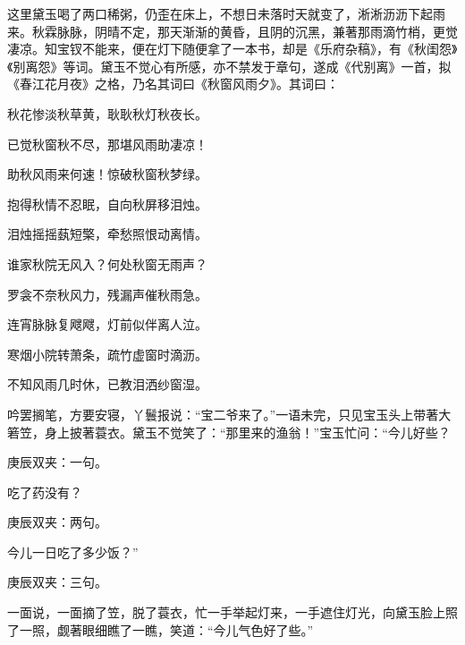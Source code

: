 \begin{parag}
    这里黛玉喝了两口稀粥，仍歪在床上，不想日未落时天就变了，淅淅沥沥下起雨来。秋霖脉脉，阴晴不定，那天渐渐的黄昏，且阴的沉黑，兼著那雨滴竹梢，更觉凄凉。知宝钗不能来，便在灯下随便拿了一本书，却是《乐府杂稿》，有《秋闺怨》《别离怨》等词。黛玉不觉心有所感，亦不禁发于章句，遂成《代别离》一首，拟《春江花月夜》之格，乃名其词曰《秋窗风雨夕》。其词曰：
\end{parag}


\begin{poem}
    \begin{pl}秋花惨淡秋草黄，耿耿秋灯秋夜长。\end{pl}

    \begin{pl}已觉秋窗秋不尽，那堪风雨助凄凉！\end{pl}

    \begin{pl}助秋风雨来何速！惊破秋窗秋梦绿。\end{pl}

    \begin{pl}抱得秋情不忍眠，自向秋屏移泪烛。\end{pl}

    \begin{pl}泪烛摇摇蓺短檠，牵愁照恨动离情。\end{pl}

    \begin{pl}谁家秋院无风入？何处秋窗无雨声？\end{pl}

    \begin{pl}罗衾不奈秋风力，残漏声催秋雨急。\end{pl}

    \begin{pl}连宵脉脉复飕飕，灯前似伴离人泣。\end{pl}

    \begin{pl}寒烟小院转萧条，疏竹虚窗时滴沥。\end{pl}

    \begin{pl}不知风雨几时休，已教泪洒纱窗湿。\end{pl}

\end{poem}


\begin{parag}
    吟罢搁笔，方要安寝，丫鬟报说：“宝二爷来了。”一语未完，只见宝玉头上带著大箬笠，身上披著蓑衣。黛玉不觉笑了：“那里来的渔翁！”宝玉忙问：“今儿好些？\begin{note}庚辰双夹：一句。\end{note}吃了药没有？\begin{note}庚辰双夹：两句。\end{note}今儿一日吃了多少饭？”\begin{note}庚辰双夹：三句。\end{note}一面说，一面摘了笠，脱了蓑衣，忙一手举起灯来，一手遮住灯光，向黛玉脸上照了一照，觑著眼细瞧了一瞧，笑道：“今儿气色好了些。”
\end{parag}


